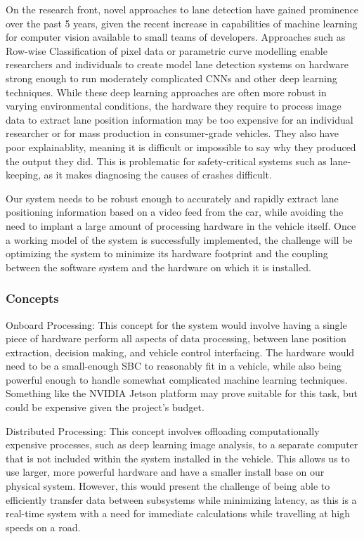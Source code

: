 \documentclass[titlepage, draft]{article}
\begin{document}
On the research front, novel approaches to lane detection have gained prominence over the past 5 years, given the recent increase in capabilities of machine learning for computer vision available to small teams of developers. Approaches such as Row-wise Classification\cite{rowwiseclass} of pixel data or parametric curve modelling \cite{feng2023rethinking} enable researchers and individuals to create model lane detection systems on hardware strong enough to run moderately complicated CNNs and other deep learning techniques. While these deep learning approaches are often more robust in varying environmental conditions, the hardware they require to process image data to extract lane position information may be too expensive for an individual researcher or for mass production in consumer-grade vehicles. They also have poor explainablity, meaning it is difficult or impossible to say why they produced the output they did. This is problematic for safety-critical systems such as lane-keeping, as it makes diagnosing the causes of crashes difficult.

Our system needs to be robust enough to accurately and rapidly extract lane positioning information based on a video feed from the car, while avoiding the need to implant a large amount of processing hardware in the vehicle itself. Once a working model of the system is successfully implemented, the challenge will be optimizing the system to minimize its hardware footprint and the coupling between the software system and the hardware on which it is installed.

\subsubsection{Concepts}
Onboard Processing: This concept for the system would involve having a single piece of hardware perform all aspects of data processing, between lane position extraction, decision making, and vehicle control interfacing. The hardware would need to be a small-enough SBC to reasonably fit in a vehicle, while also being powerful enough to handle somewhat complicated machine learning techniques. Something like the NVIDIA Jetson\cite{jetson_embeded_computing} platform may prove suitable for this task, but could be expensive given the project's budget.

Distributed Processing: This concept involves offloading computationally expensive processes, such as deep learning image analysis, to a separate computer that is not included within the system installed in the vehicle. This allows us to use larger, more powerful hardware and have a smaller install base on our physical system. However, this would present the challenge of being able to efficiently transfer data between subsystems while minimizing latency, as this is a real-time system with a need for immediate calculations while travelling at high speeds on a road.
\end{document}
